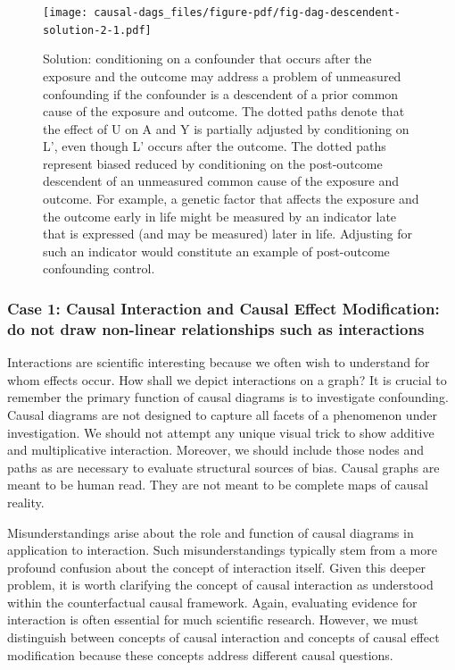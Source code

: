 \documentclass[
  singlecolumn]{article}
\begin{document}
\begin{figure}

{\centering \texttt{[image: causal-dags\_files/figure-pdf/fig-dag-descendent-solution-2-1.pdf]}

}

\caption{\label{fig-dag-descendent-solution-2}Solution: conditioning on
a confounder that occurs after the exposure and the outcome may address
a problem of unmeasured confounding if the confounder is a descendent of
a prior common cause of the exposure and outcome. The dotted paths
denote that the effect of U on A and Y is partially adjusted by
conditioning on L', even though L' occurs after the outcome. The dotted
paths represent biased reduced by conditioning on the post-outcome
descendent of an unmeasured common cause of the exposure and outcome.
For example, a genetic factor that affects the exposure and the outcome
early in life might be measured by an indicator late that is expressed
(and may be measured) later in life. Adjusting for such an indicator
would constitute an example of post-outcome confounding control.}

\end{figure}

\hypertarget{case-1-causal-interaction-and-causal-effect-modification-do-not-draw-non-linear-relationships-such-as-interactions}{%
\subsubsection{Case 1: Causal Interaction and Causal Effect
Modification: do not draw non-linear relationships such as
interactions}\label{case-1-causal-interaction-and-causal-effect-modification-do-not-draw-non-linear-relationships-such-as-interactions}}

Interactions are scientific interesting because we often wish to
understand for whom effects occur. How shall we depict interactions on a
graph? It is crucial to remember the primary function of causal diagrams
is to investigate confounding. Causal diagrams are not designed to
capture all facets of a phenomenon under investigation. We should not
attempt any unique visual trick to show additive and multiplicative
interaction. Moreover, we should include those nodes and paths as are
necessary to evaluate structural sources of bias. Causal graphs are
meant to be human read. They are not meant to be complete maps of causal
reality.

Misunderstandings arise about the role and function of causal diagrams
in application to interaction. Such misunderstandings typically stem
from a more profound confusion about the concept of interaction itself.
Given this deeper problem, it is worth clarifying the concept of causal
interaction as understood within the counterfactual causal framework.
Again, evaluating evidence for interaction is often essential for much
scientific research. However, we must distinguish between concepts of
causal interaction and concepts of causal effect modification because
these concepts address different causal questions.
\end{document}
